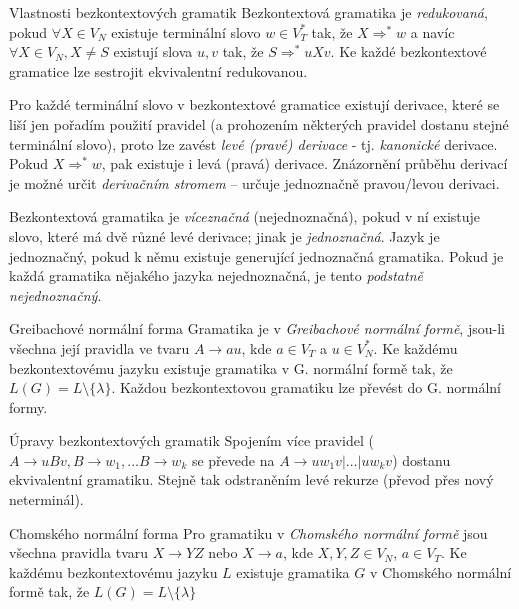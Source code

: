 \begin{poznamkaN}{Vlastnosti bezkontextových gramatik}
Bezkontextová gramatika je \emph{redukovaná}, pokud $\forall X\in V_N$ existuje terminální slovo $w\in V_T^{\ast}$ tak, že $X\Rightarrow^{\ast} w$ a navíc $\forall X\in V_N, X\neq S$ existují slova $u,v$ tak, že $S\Rightarrow^{\ast}uXv$. Ke každé bezkontextové gramatice lze sestrojit ekvivalentní redukovanou.

Pro každé terminální slovo v bezkontextové gramatice existují derivace, které se liší jen pořadím použití pravidel (a prohozením některých pravidel dostanu stejné terminální slovo), proto lze zavést \emph{levé (pravé) derivace} - tj. \emph{kanonické} derivace. Pokud $X\Rightarrow^{\ast}w$, pak existuje i levá (pravá) derivace. Znázornění průběhu derivací je možné určit \emph{derivačním stromem} -- určuje jednoznačně pravou/levou derivaci.

Bezkontextová gramatika je \emph{víceznačná} (nejednoznačná), pokud v ní existuje slovo, které má dvě různé levé derivace; jinak je \emph{jednoznačná}. Jazyk je jednoznačný, pokud k němu existuje generující jednoznačná gramatika. Pokud je každá gramatika nějakého jazyka nejednoznačná, je tento \emph{podstatně nejednoznačný}. 
\end{poznamkaN}


\begin{definiceN}{Greibachové normální forma}
Gramatika je v \emph{Greibachové normální formě}, jsou-li všechna její pravidla ve tvaru $A\to au$, kde $a\in V_T$ a $u\in V_N^{\ast}$. Ke každému bezkontextovému jazyku existuje gramatika v G. normální formě tak, že $L(G)=L\setminus\{\lambda\}$. Každou bezkontextovou gramatiku lze převést do G. normální formy.
\end{definiceN}

\begin{poznamkaN}{Úpravy bezkontextových gramatik}
Spojením více pravidel ($A\to uBv, B\to w_1, ...B\to w_k$ se převede na $A\to uw_{1}v | ... | uw_{k}v$) dostanu ekvivalentní gramatiku. Stejně tak odstraněním levé rekurze (převod přes nový neterminál). 
\end{poznamkaN}

\begin{definiceN}{Chomského normální forma}
Pro gramatiku v \emph{Chomského normální formě} jsou všechna pravidla tvaru $X\to YZ$ nebo $X\to a$, kde $X,Y,Z\in V_N$, $a\in V_T$. Ke každému bezkontextovému jazyku $L$ existuje gramatika $G$ v Chomského normální formě tak, že $L(G)=L\setminus\{\lambda\}$
\end{definiceN}


